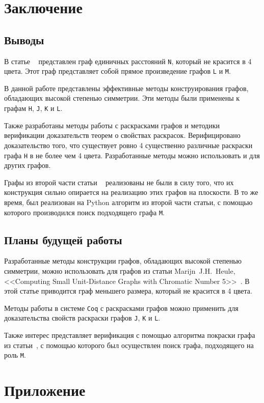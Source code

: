 \chapter{Заключение}
\section{Выводы}
В статье ~\cite{deGrey} представлен граф единичных расстояний {\tt N}, который не красится в 4 цвета. Этот граф представляет собой прямое произведение графов {\tt L} и {\tt M}.

В данной работе представлены эффективные методы конструирования графов, обладающих высокой степенью симметрии. Эти методы были применены к графам {\tt H}, {\tt J}, {\tt K} и {\tt L}.

Также разработаны методы работы с раскрасками графов и методики верификации доказательств теорем о свойствах раскрасок. Верифицировано доказательство того, что существует ровно 4 существенно различные раскраски графа {\tt H} в не более чем 4 цвета. Разработанные методы можно использовать и для других графов.

Графы из второй части статьи ~\cite{deGrey} реализованы не были в силу того, что их конструкция сильно опирается на реализацию этих графов на плоскости. В то же время, был реализован на Python алгоритм из второй части статьи, с помощью которого производился поиск подходящего графа {\tt M}.

\section{Планы будущей работы}
Разработанные методы конструкции графов, обладающих высокой степенью симметрии, можно использовать для графов из статьи Marijn~J.H.~Heule, <<Computing Small Unit-Distance Graphs with Chromatic Number 5>>~\cite{Huele}. В этой статье приводится граф меньшего размера, который не красится в 4 цвета.

Методы работы в системе {\tt Coq} с раскрасками графов можно применить для доказательства свойств раскраски графов {\tt J}, {\tt K} и {\tt L}.

Также интерес представляет верификация с помощью {\Coq} алгоритма покраски графа из статьи~\cite{deGrey}, с помощью которого был осуществлен поиск графа, подходящего на роль {\tt M}.

\chapter{Приложение}

